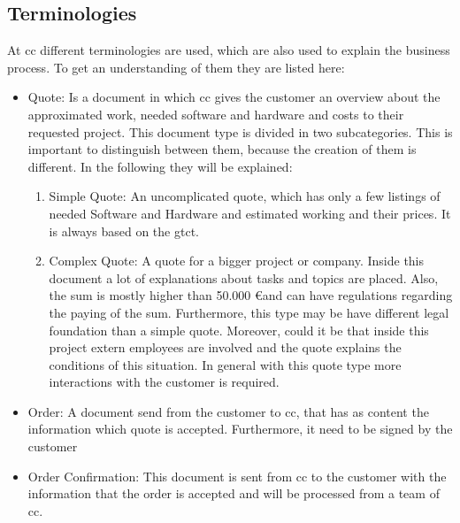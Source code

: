\subsection*{Terminologies}
At \gls{cc} different terminologies are used, which are also used to explain the business process. To get an understanding of them they are listed here:
\begin{itemize}
	\item Quote: \newline
	Is a document in which \gls{cc} gives the customer an overview about the approximated work, needed software and hardware and costs to their requested project. This document type is divided in two subcategories. This is important to distinguish between them, because the creation of them is different. In the following they will be explained:
	\begin{enumerate}
		\item Simple Quote: \newline
		An uncomplicated quote, which has only a few listings of needed Software and Hardware and estimated working and their prices. It is always based on the \gls{gtct}.
		\item Complex Quote: \newline
		A quote for a bigger project or company. Inside this document a lot of explanations about tasks and topics are placed. Also, the sum is mostly higher than 50.000 \euro and can have regulations regarding the paying of the sum. Furthermore, this type may be have different legal foundation than a simple quote. Moreover, could it be that inside this project extern employees are involved and the quote explains the conditions of this situation. In general with this quote type more interactions with the customer is required. 
	\end{enumerate}
	\item Order: \newline
	A document send from the customer to \gls{cc}, that has as content the information which quote is accepted. Furthermore, it need to be signed by the customer
	\item Order Confirmation: \newline
	This document is sent from \gls{cc} to the customer with the information that the order is accepted and will be processed from a team of \gls{cc}.
\end{itemize}

